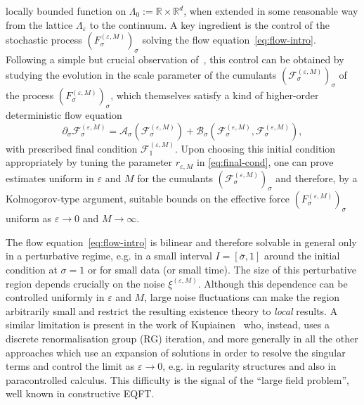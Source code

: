 \documentclass{article}
\numberwithin{equation}{section}
\newcommand{\assign}{:=}
\theoremstyle{plain}
\theoremstyle{definition}
\begin{document}
locally bounded function on $\Lambda_0 \assign \mathbb{R} \times
\mathbb{R}^d$, when extended in some reasonable way from the lattice
$\Lambda_{\varepsilon}$ to the continuum. A key ingredient is the control of
the stochastic process $(F^{(\varepsilon, M)}_{\sigma})_{\sigma}$ solving the
flow equation~\eqref{eq:flow-intro}. Following a simple but crucial
observation
of~{\cite{duchFlowEquationApproach2021,duchRenormalizationSingularElliptic2022}},
this control can be obtained by studying the evolution in the scale parameter
of the cumulants $(\mathcal{F}_{\sigma}^{(\varepsilon, M)})_{\sigma}$ of the
process $(F^{(\varepsilon, M)}_{\sigma})_{\sigma}$, which themselves satisfy a
kind of higher-order deterministic flow equation
\begin{equation}
  \partial_{\sigma} \mathcal{F}_{\sigma}^{(\varepsilon, M)}
  =\mathcal{A}_{\sigma} (\mathcal{F}_{\sigma}^{(\varepsilon, M)})
  +\mathcal{B}_{\sigma} (\mathcal{F}_{\sigma}^{(\varepsilon, M)},
  \mathcal{F}_{\sigma}^{(\varepsilon, M)}), \label{eq:flow-cumul-intro}
\end{equation}
with prescribed final condition $\mathcal{F}_1^{(\varepsilon, M)}$. Upon
choosing this initial condition appropriately by tuning the parameter
$r_{\varepsilon, M}$ in \eqref{eq:final-cond}, one can prove estimates uniform in
$\varepsilon$ and $M$ for the cumulants
$(\mathcal{F}_{\sigma}^{(\varepsilon, M)})_{\sigma}$ and therefore, by a
Kolmogorov-type argument, suitable bounds on the effective force
$(F^{(\varepsilon, M)}_{\sigma})_{\sigma}$ uniform as $\varepsilon \rightarrow
0$ and $M \rightarrow \infty$.

The flow equation~\eqref{eq:flow-intro} is bilinear and therefore solvable in
general only in a perturbative regime, e.g. in a small interval $I =
[\bar{\sigma}, 1]$ around the initial condition at $\sigma = 1$ or for small
data (or small time). The size of this perturbative region depends crucially
on the noise $\xi^{(\varepsilon, M)}$. Although this dependence can be
controlled uniformly in $\varepsilon$ and $M$, large noise fluctuations can
make the region arbitrarily small and restrict the resulting existence theory
to \textit{local} results. A similar
limitation is present in the work of
Kupiainen~{\cite{kupiainen2016renormalization}} who, instead, uses a discrete
renormalisation group (RG) iteration, and more generally in all the other
approaches which use an expansion of solutions in order to resolve the
singular terms and control the limit as $\varepsilon \rightarrow 0$, e.g. in
regularity structures and also in paracontrolled calculus. This difficulty is
the signal of the ``large field problem'', well known in constructive EQFT.
\end{document}
